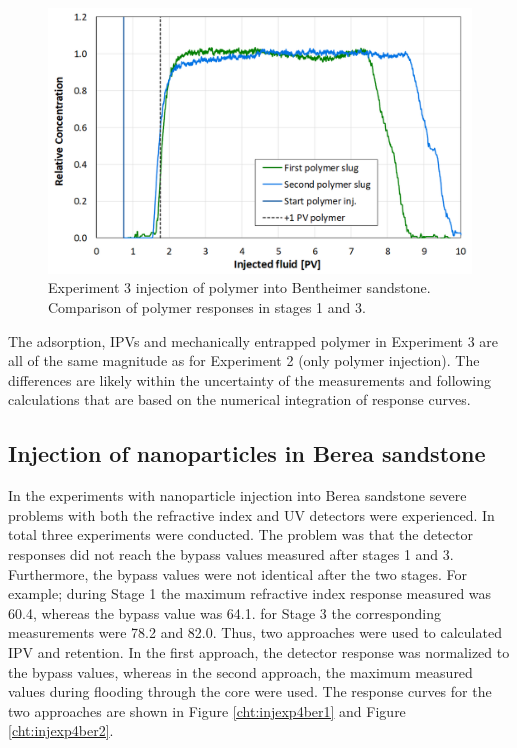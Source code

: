 \begin{figure}[h!]
    \centering
    \includegraphics[width=.85\textwidth]{img/cht/injexp3bentPol.png}
    \caption{Experiment 3 injection of polymer into Bentheimer sandstone. Comparison of polymer responses in stages 1 and 3.}
    \label{cht:injexp3bentPol}
\end{figure}

The adsorption, IPVs and mechanically entrapped polymer in Experiment 3 are all of the same magnitude as for Experiment 2 (only polymer injection). The differences are likely within the uncertainty of the measurements and following calculations that are based on the numerical integration of response curves.



\subsection{Injection of nanoparticles in Berea sandstone}
In the experiments with nanoparticle injection into Berea sandstone severe problems with both the refractive index and UV detectors were experienced. In total three experiments were conducted. The problem was that the detector responses did not reach the bypass values measured after stages 1 and 3. Furthermore, the bypass values were not identical after the two stages. For example; during Stage 1 the maximum refractive index response measured was 60.4, whereas the bypass value was 64.1. for Stage 3 the corresponding measurements were 78.2 and 82.0. Thus, two approaches were used to calculated IPV and retention. In the first approach, the detector response was normalized to the bypass values, whereas in the second approach, the maximum measured values during flooding through the core were used. The response curves for the two approaches are shown in Figure \ref{cht:injexp4ber1} and Figure \ref{cht:injexp4ber2}. 

